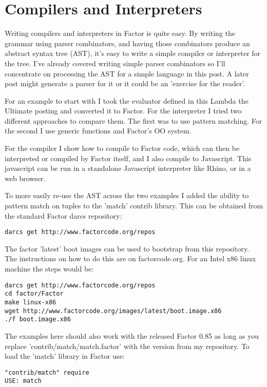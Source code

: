 \chapter{Compilers and Interpreters}\label{compilers}

Writing compilers and interpreters in Factor is quite easy. By writing
the grammar using parser combinators, and having those combinators
produce an abstract syntax tree (AST), it's easy to write a simple
compiler or interpreter for the tree. I've already covered writing
simple parser combinators so I'll concentrate on processing the AST
for a simple language in this post. A later post might generate a
parser for it or it could be an 'exercise for the reader'.

For an example to start with I took the evaluator defined in this
Lambda the Ultimate posting and converted it to Factor. For the
interpreter I tried two different approaches to compare them. The
first was to use pattern matching. For the second I use generic
functions and Factor's OO system.

For the compiler I show how to compile to Factor code, which can then
be interpreted or compiled by Factor itself, and I also compile to
Javascript. This javascript can be run in a standalone Javascript
interpreter like Rhino, or in a web browser.

To more easily re-use the AST across the two examples I added the
ability to pattern match on tuples to the 'match' contrib
library. This can be obtained from the standard Factor darcs
repository:
\begin{verbatim}
darcs get http://www.factorcode.org/repos
\end{verbatim}


The factor 'latest' boot images can be used to bootstrap from this
repository. The instructions on how to do this are on
factorcode.org. For an Intel x86 linux machine the steps would be:

\begin{verbatim}
darcs get http://www.factorcode.org/repos
cd factor/Factor
make linux-x86
wget http://www.factorcode.org/images/latest/boot.image.x86
./f boot.image.x86
\end{verbatim}

The examples here should also work with the released Factor 0.85 as
long as you replace 'contrib/match/match.factor' with the version from
my repository. To load the 'match' library in Factor use:

\begin{verbatim}
"contrib/match" require
USE: match
\end{verbatim}

